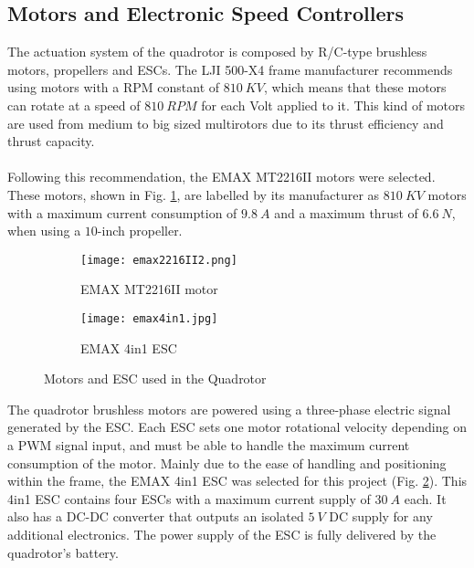 \subsection{Motors and Electronic Speed Controllers}
The actuation system of the quadrotor is composed by R/C-type brushless motors, propellers and ESCs. The LJI 500-X4 frame manufacturer recommends using motors with a RPM constant of $810\ KV$, which means that these motors can rotate at a speed of $810\ RPM$ for each Volt applied to it. This kind of motors are used from medium to big sized multirotors due to its thrust efficiency and thrust capacity.
\\\\
Following this recommendation, the EMAX MT2216II motors were selected. These motors, shown in Fig. \ref{fig:emaxmotor}, are labelled by its manufacturer as $810\ KV$ motors with a maximum current consumption of $9.8\ A$ and a maximum thrust of $6.6\ N$, when using a $10$-inch propeller.
\begin{figure}[H]
\begin{subfigure}{.5\linewidth}
\centering
\texttt{[image: emax2216II2.png]}    
\caption{EMAX MT2216II motor} 
\label{fig:emaxmotor}
\end{subfigure}
\begin{subfigure}{.5\linewidth}
\centering
\texttt{[image: emax4in1.jpg]}    
\caption{EMAX 4in1 ESC} 
\label{fig:emaxESC}
\end{subfigure}
\caption[Motors and ESC used in the Quadrotor]{Motors and ESC used in the Quadrotor\protect\footnotemark}
\label{fig:motorandesc}
\end{figure}
The quadrotor brushless motors are powered using a three-phase electric signal generated by the ESC. Each ESC sets one motor rotational velocity depending on a PWM signal input, and must be able to handle the maximum current consumption of the motor. Mainly due to the ease of handling and positioning within the frame, the EMAX 4in1 ESC was selected for this project (Fig. \ref{fig:emaxESC}). This 4in1 ESC contains four ESCs with a maximum current supply of $30\ A$ each. It also has a DC-DC converter that outputs an isolated $5\ V$ DC supply for any additional electronics. The power supply of the ESC is fully delivered by the quadrotor's battery.

